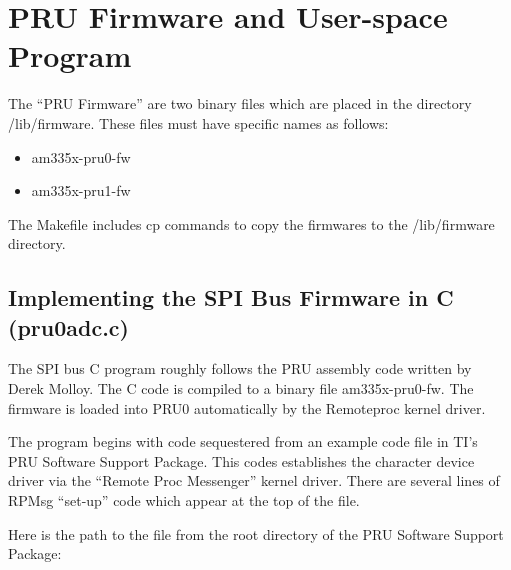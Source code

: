 %
%
%

\chapter{PRU Firmware and User-space Program}

The ``PRU Firmware'' are two binary files which are placed in the directory /lib/firmware.
These files must have specific names as follows:

\begin{itemize}
	\item am335x-pru0-fw
	\item am335x-pru1-fw
\end{itemize}

The Makefile includes cp commands to copy the firmwares to the /lib/firmware directory.

\section{Implementing the SPI Bus Firmware in C (pru0adc.c)}

The SPI bus C program roughly follows the PRU assembly code written by Derek Molloy.  The C code is compiled to a binary file am335x-pru0-fw. The firmware is loaded into PRU0 automatically by the Remoteproc kernel driver.

The program begins with code sequestered from an example code file in TI's PRU Software
Support Package.  This codes establishes the character device driver via the ``Remote Proc Messenger''
kernel driver.  There are several lines of RPMsg ``set-up'' code which appear at the top of the file.

Here is the path to the file from the root directory of the PRU Software Support Package:

